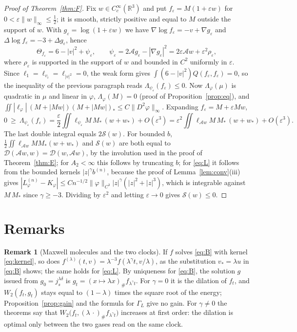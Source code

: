\documentclass[11pt]{amsart}
\theoremstyle{definition}
\newtheorem{remark}[theorem]{Remark}
\newcommand{\RR}{\mathbb{R}}
\begin{document}
\begin{proof}[Proof of Theorem~\ref{thm:F}]
Fix $w\in C^\infty_c(\RR^3)$ and put $f_\varepsilon=M(1+\varepsilon w)$ for $0<\varepsilon\|w\|_\infty\le\frac12$; it is smooth, strictly positive and equal to $M$ outside the support of $w$. With $g_\varepsilon=\log(1+\varepsilon w)$ we have $\nabla\log f_\varepsilon=-v+\nabla g_\varepsilon$ and $\Delta\log f_\varepsilon=-3+\Delta g_\varepsilon$, hence
\[
\Theta_{f_\varepsilon}=6-|v|^2+\psi_\varepsilon,\qquad\psi_\varepsilon=2\mathcal Ag_\varepsilon-|\nabla g_\varepsilon|^2=2\varepsilon\mathcal Aw+\varepsilon^2\rho_\varepsilon ,
\]
where $\rho_\varepsilon$ is supported in the support of $w$ and bounded in $C^2$ uniformly in $\varepsilon$. Since $\ell_1=\ell_{v_i}=\ell_{|v|^2}=0$, the weak form gives $\int(6-|v|^2)Q(f_\varepsilon,f_\varepsilon)=0$, so the inequality of the previous paragraph reads $\Lambda_{\psi_\varepsilon}(f_\varepsilon)\le0$. Now $\Lambda_\varphi(\mu)$ is quadratic in $\mu$ and linear in $\varphi$, $\Lambda_\varphi(M)=0$ (proof of Proposition~\ref{prop:eq}), and $\iint|\ell_\varphi|\,(M+|Mw|)(M+|Mw|)_*\le C\|D^2\varphi\|_\infty$. Expanding $f_\varepsilon=M+\varepsilon Mw$,
\[
0\ \ge\ \Lambda_{\psi_\varepsilon}(f_\varepsilon)=\frac\varepsilon2\iint\ell_{\psi_\varepsilon}M\,M_*\,(w+w_*)+O(\varepsilon^3)=\varepsilon^2\iint\ell_{\mathcal Aw}M\,M_*\,(w+w_*)+O(\varepsilon^3).
\]
The last double integral equals $2\mathcal S(w)$. For bounded $b$, $\frac12\iint\ell_{\mathcal Aw}MM_*(w+w_*)$ and $\mathcal S(w)$ are both equal to $\mathcal D(\mathcal Aw,w)=\mathcal D(w,\mathcal Aw)$, by the involution used in the proof of Theorem~\ref{thm:E}; for $A_2<\infty$ this follows by truncating $b$; for \eqref{eq:L} it follows from the bounded kernels $|z|^\gamma b^{(n)}$, because the proof of Lemma~\ref{lem:conv}(iii) gives $|L^{(n)}_\varphi-K_\varphi|\le Cn^{-1/2}\|\varphi\|_{C^3}|z|^\gamma(|z|^2+|z|^3)$, which is integrable against $M\,M_*$ since $\gamma\ge-3$. Dividing by $\varepsilon^2$ and letting $\varepsilon\to0$ gives $\mathcal S(w)\le0$.
\end{proof}

\section{Remarks}\label{sec:remarks}

\begin{remark}[Maxwell molecules and the two clocks]\label{rem:maxwell}
If $f$ solves \eqref{eq:B} with kernel \eqref{eq:kernel}, so does $f^{(\lambda)}(t,v)=\lambda^{-3}f(\lambda^\gamma t,v/\lambda)$, as the substitution $v_*=\lambda u$ in \eqref{eq:B} shows; the same holds for \eqref{eq:L}. By uniqueness for \eqref{eq:B}, the solution $g$ issued from $g_0=j^{\lambda\delta}_s$ is $g_t=(x\mapsto\lambda x)_\#f_{\lambda^\gamma t}$. For $\gamma=0$ it is the dilation of $f_t$, and $W_2(f_t,g_t)$ stays equal to $(1-\lambda)$ times the square root of the energy; Proposition~\ref{prop:gain} and the formula for $\Gamma_L$ give no gain. For $\gamma\ne0$ the theorems say that $W_2\big(f_t,(\lambda\,\cdot)_\#f_{\lambda^\gamma t}\big)$ increases at first order: the dilation is optimal only between the two gases read on the same clock.
\end{remark}
\end{document}
